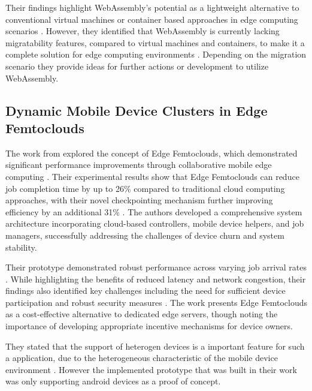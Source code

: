 Their findings highlight WebAssembly's potential as a lightweight alternative to conventional virtual machines or container based approaches in edge computing scenarios \cite{relatedwork:wasmedgecomputing}. However, they identified that WebAssembly is currently lacking migratability features, compared to virtual machines and containers, to make it a complete solution for edge computing environments \cite{relatedwork:wasmedgecomputing}. Depending on the migration scenario they provide ideas for further actions or development to utilize WebAssembly.

\subsection{Dynamic Mobile Device Clusters in
Edge Femtoclouds}
The work from \citeauthor{relatedwork:mobilecloud} \cite{relatedwork:mobilecloud} explored the concept of Edge Femtoclouds, which demonstrated significant performance improvements through collaborative mobile edge computing \cite{relatedwork:mobilecloud}. Their experimental results show that Edge Femtoclouds can reduce job completion time by up to 26\% compared to traditional cloud computing approaches, with their novel checkpointing mechanism further improving efficiency by an additional 31\% \cite{relatedwork:mobilecloud}. The authors developed a comprehensive system architecture incorporating cloud-based controllers, mobile device helpers, and job managers, successfully addressing the challenges of device churn and system stability. 

Their prototype demonstrated robust performance across varying job arrival rates \cite{relatedwork:mobilecloud}. While highlighting the benefits of reduced latency and network congestion, their findings also identified key challenges including the need for sufficient device participation and robust security measures \cite{relatedwork:mobilecloud}. The work presents Edge Femtoclouds as a cost-effective alternative to dedicated edge servers, though noting the importance of developing appropriate incentive mechanisms for device owners.

They stated that the support of heterogen devices is a important feature for such a application, due to the heterogeneous characteristic of the mobile device environment \cite{relatedwork:mobilecloud}. However the implemented prototype that was built in their work was only supporting android devices as a proof of concept.